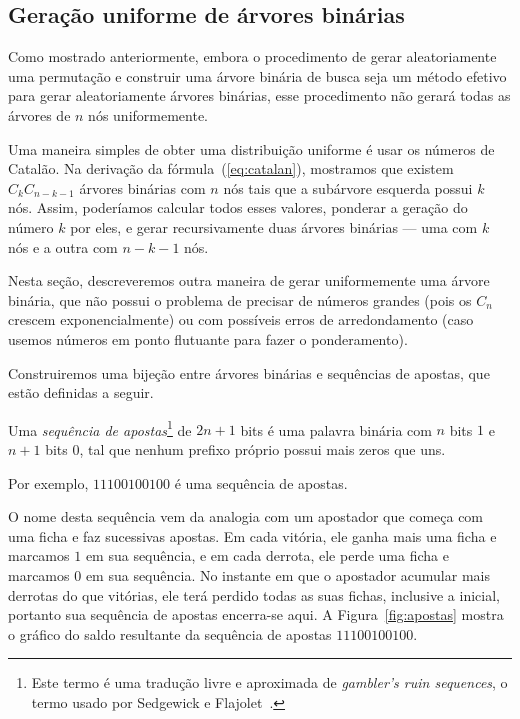 \subsection{Geração uniforme de árvores binárias}

Como mostrado anteriormente,
embora o procedimento de gerar aleatoriamente uma permutação
e construir uma árvore binária de busca
seja um método efetivo para gerar aleatoriamente árvores binárias,
esse procedimento não gerará todas as árvores de $n$ nós uniformemente.

Uma maneira simples de obter uma distribuição uniforme
é usar os números de Catalão.
Na derivação da fórmula~(\ref{eq:catalan}),
mostramos que existem $C_k C_{n-k-1}$ árvores binárias com $n$ nós
tais que a subárvore esquerda possui $k$ nós.
Assim,
poderíamos calcular todos esses valores,
ponderar a geração do número $k$ por eles,
e gerar recursivamente duas árvores binárias
--- uma com $k$ nós e a outra com $n - k - 1$ nós.

Nesta seção,
descreveremos outra maneira de gerar uniformemente uma árvore binária,
que não possui o problema de precisar de números grandes
(pois os $C_n$ crescem exponencialmente)
ou com possíveis erros de arredondamento
(caso usemos números em ponto flutuante para fazer o ponderamento).

Construiremos uma bijeção entre árvores binárias e sequências de apostas,
que estão definidas a seguir.

\begin{definition}
    Uma \emph{sequência de apostas}\footnote{
        Este termo é uma tradução livre e aproximada de \emph{gambler's ruin sequences},
        o termo usado por Sedgewick e Flajolet~\cite[p.~268]{SedgewickFlajolet2013}.
    }
    de $2n+1$ bits
    é uma palavra binária com $n$ bits $1$ e $n+1$ bits $0$,
    tal que
    nenhum prefixo próprio possui mais zeros que uns.
\end{definition}

Por exemplo, $11100100100$ é uma sequência de apostas.

O nome desta sequência vem da analogia com um apostador
que começa com uma ficha e faz sucessivas apostas.
Em cada vitória, ele ganha mais uma ficha e marcamos $1$ em sua sequência,
e em cada derrota, ele perde uma ficha e marcamos $0$ em sua sequência.
No instante em que o apostador acumular mais derrotas do que vitórias,
ele terá perdido todas as suas fichas, inclusive a inicial,
portanto sua sequência de apostas encerra-se aqui.
A Figura~\ref{fig:apostas}
mostra o gráfico do saldo resultante da sequência de apostas $11100100100$.

